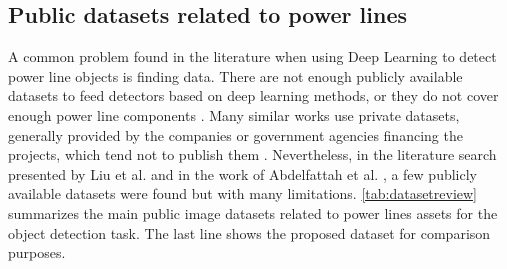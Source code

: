 \documentclass[10pt,conference]{IEEEtran}
\begin{document}
\subsection{Public datasets related to power lines}
\label{sec:data-discussion} 

A common problem found in the literature when using Deep Learning to detect power line objects is finding data. There are not enough publicly available datasets to feed detectors based on deep learning methods, or they do not cover enough power line components \cite{nguyen2018automatic, liu2020review}. Many similar works use private datasets, generally provided by the companies or government agencies financing the projects, which tend not to publish them \cite{lei2019intelligent,yang2019insulator,nguyen2018automatic,zhang2019learning,siddiqui2018robust}. Nevertheless, in the literature search presented by Liu et al. \cite{liu2020review} and in the work of Abdelfattah et al. \cite{abdelfattah2020ttpla}, a few publicly available datasets were found but with many limitations. \autoref{tab:datasetreview} summarizes the main public image datasets related to power lines assets for the object detection task. The last line shows the proposed dataset for comparison purposes.
\end{document}
